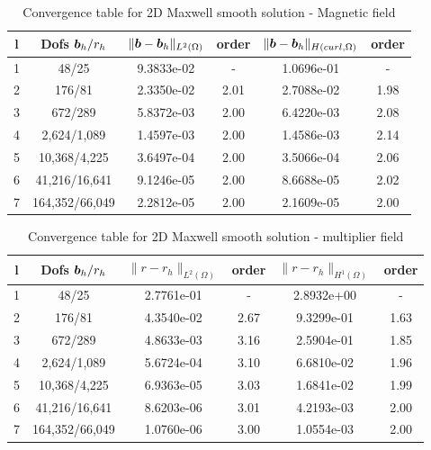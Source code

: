 \begin{table}[h!] \small
\begin{center}
\begin{tabular}{cccccc}
\hline
l &    Dofs $\boldsymbol b_h/r_h$ & $\|\boldsymbol b-\boldsymbol b_h\|_{L^2(\Omega)}$ & order & $\|\boldsymbol b-\boldsymbol b_h\|_{H(curl,\Omega)}$ & order \\
\hline
1 &      48/25 &  9.3833e-02 &    - &  1.0696e-01 &       - \\
2 &     176/81 &  2.3350e-02 &    2.01 &  2.7088e-02 &       1.98 \\
3 &     672/289 &  5.8372e-03 &    2.00 &  6.4220e-03 &       2.08 \\
4 &    2,624/1,089 &  1.4597e-03 &    2.00 &  1.4586e-03 &       2.14 \\
5 &   10,368/4,225 &  3.6497e-04 &    2.00 &  3.5066e-04 &       2.06 \\
6 &   41,216/16,641 &  9.1246e-05 &    2.00 &  8.6688e-05 &       2.02 \\
7 &  164,352/66,049 &  2.2812e-05 &    2.00 &  2.1609e-05 &       2.00 \\
\hline
\end{tabular}
\caption{Convergence table for 2D Maxwell smooth solution - Magnetic field}
\label{tab:2D_maxwell_magnetic}
\end{center}
\end{table}
\begin{table}[h!] \small
\begin{center}
\begin{tabular}{cccccc}
\hline
l &    Dofs $\boldsymbol b_h/r_h$ & $\|{r}-{r}_h\|_{L^2(\Omega)}$ & order & $\|{r}-{r}_h\|_{H^1(\Omega)}$ & order\\
\hline
 1 &      48/25 &  2.7761e-01 &    - &  2.8932e+00 &     - \\
 2 &     176/81 &  4.3540e-02 &    2.67 &  9.3299e-01 &     1.63 \\
 3 &     672/289 &  4.8633e-03 &    3.16 &  2.5904e-01 &     1.85 \\
 4 &    2,624/1,089 &  5.6724e-04 &    3.10 &  6.6810e-02 &     1.96 \\
 5 &   10,368/4,225 &  6.9363e-05 &    3.03 &  1.6841e-02 &     1.99 \\
 6 &   41,216/16,641 &  8.6203e-06 &    3.01 &  4.2193e-03 &     2.00 \\
 7 &  164,352/66,049 &  1.0760e-06 &    3.00 &  1.0554e-03 &     2.00 \\

\hline
\end{tabular}
\caption{Convergence table for 2D Maxwell smooth solution - multiplier field}
\label{tab:2D_maxwell_multiplier}

\end{center}
\end{table}

